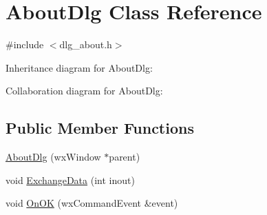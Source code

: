 \hypertarget{class_about_dlg}{\section{About\-Dlg Class Reference}
\label{class_about_dlg}
}


{\ttfamily \#include $<$dlg\-\_\-about.\-h$>$}



Inheritance diagram for About\-Dlg\-:


Collaboration diagram for About\-Dlg\-:
\subsection*{Public Member Functions}
\begin{DoxyCompactItemize}
\item 
\hyperlink{class_about_dlg_ac17a2e5d541346e2edabcddf043afa6e}{About\-Dlg} (wx\-Window $\ast$parent)
\item 
void \hyperlink{class_about_dlg_a7d2ed58523d2d19eb725e338536166ce}{Exchange\-Data} (int inout)
\item 
void \hyperlink{class_about_dlg_a9b05b19d38b28255852cddc804760334}{On\-O\-K} (wx\-Command\-Event \&event)
\end{DoxyCompactItemize}
